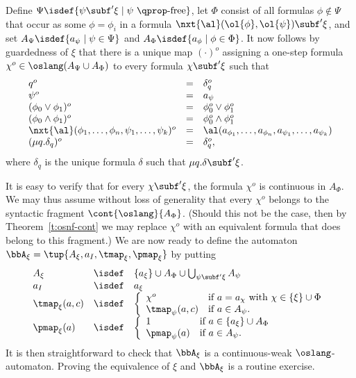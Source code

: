 Define
$\Psi \isdef \{ \psi \subf' \xi \mid \psi\text{ $\qprop$-free} \}$, let $\Phi$
consist of all formulas $\phi \not\in \Psi$ that occur as some $\phi = \phi_{i}$
in a formula $\nxt{\al}(\ol{\phi},\ol{\psi}) \subf' \xi$, and set $A_{\Psi} 
\isdef \{ a_{\psi} \mid \psi \in \Psi \}$ and $A_{\Phi} \isdef \{ a_{\phi} \mid 
\phi \in \Phi \}$.
It now follows by guardedness of $\xi$ that there is a unique map $(\cdot)^{o}$ 
assigning a one-step formula $\chi^{o} \in \oslang(A_{\Psi} \cup A_{\Phi})$
to every formula $\chi \subf' \xi$ such that 
\[\begin{array}{lll}
   q^{o}    & = & \delta_{q}^{o}
\\ \psi^{o} & = & a_{\psi}
\\ (\phi_{0}\lor\phi_{1})^{o}  & = & \phi_{0}^{o} \lor \phi_{1}^{o}
\\ (\phi_{0}\land\phi_{1})^{o} & = & \phi_{0}^{o} \land \phi_{1}^{o}
\\ \nxt{\al}(\phi_{1},\ldots,\phi_{n},\psi_{1},\ldots,\psi_{k})^{o} & = &
   \al(a_{\phi_{1}},\ldots,a_{\phi_{n}},a_{\psi_{1}},\ldots,a_{\psi_{k}})
\\ (\mu q. \delta_{q})^{o}     & = & \delta_{q}^{o},
\end{array}\]
where $\delta_{q}$ is the unique formula $\delta$ such that $\mu q.\delta 
\subf' \xi$.

It is easy to verify that for every $\chi \subf' \xi$, the formula $\chi^{o}$ 
is continuous in $A_{\Phi}$.
We may thus assume without loss of generality that every $\chi^{o}$ belongs to
the syntactic fragment $\cont{\oslang}{A_{\Phi}}$.
(Should this not be the case, then by Theorem~\ref{t:osnf-cont} we may replace
$\chi^{o}$ with an equivalent formula that does belong to this fragment.)
We are now ready to define the automaton $\bbA_{\xi} = \tup{A_{\xi},a_{I},
\tmap_{\xi},\pmap_{\xi}}$ by putting 
\[\begin{array}{lll}
A_{\xi} &\isdef& \{ a_{\xi} \} \cup A_{\Phi} \cup \bigcup_{\psi\subf'\xi}A_{\psi}
\\ a_{I}    &\isdef& a_{\xi}
\\ \tmap_{\xi}(a,c) &\isdef& 
   \left\{\begin{array}{ll}
    \chi^{o} & \text{if } a = a_{\chi} \text{ with } \chi \in \{ \xi \} \cup \Phi
   \\ \tmap_{\psi}(a,c) & \text{if } a \in A_{\psi}.
   \end{array}\right.
\\ \pmap_{\xi}(a) &\isdef& 
   \left\{\begin{array}{ll}
   1 & \text{if } a \in \{ a_{\xi} \} \cup A_{\Phi}
   \\ \pmap_{\psi}(a) & \text{if } a \in A_{\psi}.
   \end{array}\right.
\end{array}\]
It is then straightforward to check that $\bbA_{\xi}$ is a continuous-weak
$\oslang$-automaton.
Proving the equivalence of $\xi$ and $\bbA_{\xi}$ is a routine exercise.


